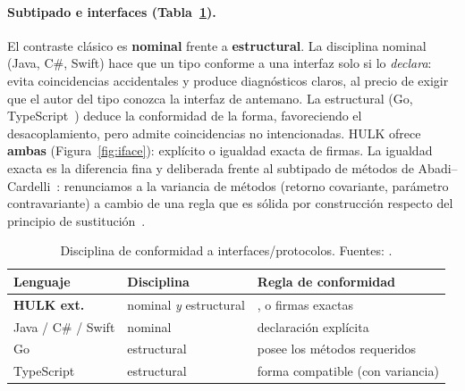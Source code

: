 \documentclass[14pts,runningheads,a4paper]{llncs}
\newcommand{\code}[1]{\texttt{\detokenize{#1}}}
\begin{document}
\paragraph{Subtipado e interfaces (Tabla~\ref{tab:cmp-sub}).}
El contraste cl\'asico es \textbf{nominal} frente a \textbf{estructural}. La disciplina
nominal (Java, C\#, Swift) hace que un tipo conforme a una interfaz solo si lo
\emph{declara}: evita coincidencias accidentales y produce diagn\'osticos claros, al
precio de exigir que el autor del tipo conozca la interfaz de antemano. La estructural
(Go, TypeScript~\cite{bierman2014typescript}) deduce la conformidad de la forma,
favoreciendo el desacoplamiento, pero admite coincidencias no intencionadas. HULK
ofrece \textbf{ambas} (Figura~\ref{fig:iface}): \code{implements} expl\'icito o
igualdad exacta de firmas. La igualdad exacta es la diferencia fina y deliberada
frente al subtipado de m\'etodos de Abadi--Cardelli~\cite{abadi1996objects}: renunciamos
a la variancia de m\'etodos (retorno covariante, par\'ametro contravariante) a cambio de
una regla que es s\'olida por construcci\'on respecto del principio de
sustituci\'on~\cite{liskov1994subtyping}.

\begin{table}[tbp]
\centering\small
\caption{Disciplina de conformidad a interfaces/protocolos. Fuentes:
\cite{cardelli1985understanding,abadi1996objects,golang,bierman2014typescript,liskov1994subtyping}.}
\label{tab:cmp-sub}
\begin{tabular}{@{}lll@{}}
\toprule
\textbf{Lenguaje} & \textbf{Disciplina} & \textbf{Regla de conformidad} \\
\midrule
\textbf{HULK ext.} & nominal \emph{y} estructural & \code{implements}, o firmas exactas \\
Java / C\# / Swift & nominal & declaraci\'on expl\'icita \\
Go & estructural & posee los m\'etodos requeridos \\
TypeScript & estructural & forma compatible (con variancia) \\
\bottomrule
\end{tabular}
\end{table}
\end{document}
